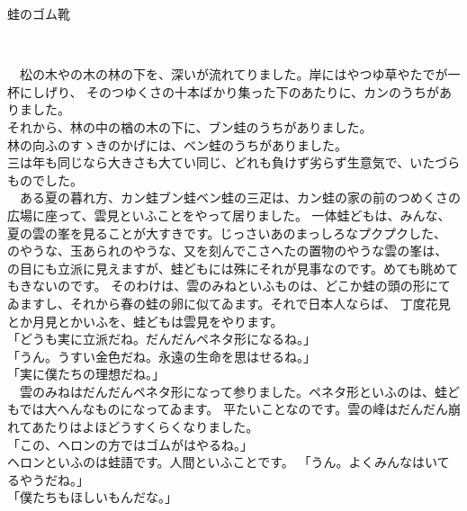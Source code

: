 \documentclass[
a4paper,
fontsize=20pt,
jafontsize=20pt,
book]
{tarticle}
\begin{document}
\fontsize{16pt}{30pt}\selectfont
\rubysetup{(-)} %

蛙のゴム靴\\
\begin{flushright}
\\
\end{flushright}



　松の木やの木の林の下を、深いが流れてりました。岸にはやつゆ草やたでが一杯にしげり、
そのつゆくさの十本ばかり集った下のあたりに、カンのうちがありました。\\
それから、林の中の楢の木の下に、ブン蛙のうちがありました。\\
林の向ふのすゝきのかげには、ベン蛙のうちがありました。\\
三は年も同じなら大きさも大てい同じ、どれも負けず劣らず生意気で、いたづらものでした。\\
　ある夏の暮れ方、カン蛙ブン蛙ベン蛙の三疋は、カン蛙の家の前のつめくさの広場に座って、雲見といふことをやって居りました。
一体蛙どもは、みんな、夏の雲の峯を見ることが大すきです。じっさいあのまっしろなプクプクした、
のやうな、玉あられのやうな、又を刻んでこさへたの置物のやうな雲の峯は、
の目にも立派に見えますが、蛙どもには殊にそれが見事なのです。めても眺めてもきないのです。
そのわけは、雲のみねといふものは、どこか蛙の頭の形にてゐますし、それから春の蛙の卵に似てゐます。それで日本人ならば、
丁度花見とか月見とかいふを、蛙どもは雲見をやります。\\
「どうも実に立派だね。だんだんペネタ形になるね。」\\
「うん。うすい金色だね。永遠の生命を思はせるね。」\\
「実に僕たちの理想だね。」\\
　雲のみねはだんだんペネタ形になって参りました。ペネタ形といふのは、蛙どもでは大へんなものになってゐます。
平たいことなのです。雲の峰はだんだん崩れてあたりはよほどうすくらくなりました。\\
「この、ヘロンの方ではゴムがはやるね。」\\
ヘロンといふのは蛙語です。人間といふことです。
「うん。よくみんなはいてるやうだね。」\\
「僕たちもほしいもんだな。」\\
\end{document}
